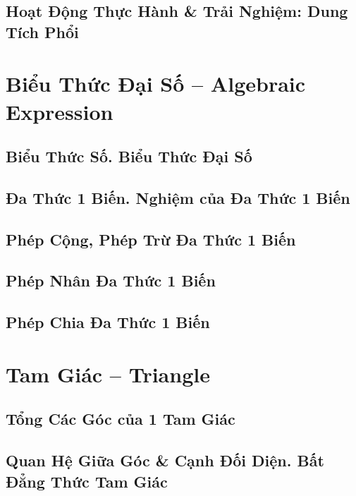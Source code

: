 \documentclass[oneside]{book}
\numberwithin{equation}{section}
\begin{document}
\section{Hoạt Động Thực Hành \& Trải Nghiệm: Dung Tích Phổi}


\chapter{Biểu Thức Đại Số -- Algebraic Expression}

\section{Biểu Thức Số. Biểu Thức Đại Số}

\section{Đa Thức 1 Biến. Nghiệm của Đa Thức 1 Biến}

\section{Phép Cộng, Phép Trừ Đa Thức 1 Biến}

\section{Phép Nhân Đa Thức 1 Biến}

\section{Phép Chia Đa Thức 1 Biến}


\chapter{Tam Giác -- Triangle}

\section{Tổng Các Góc của 1 Tam Giác}

\section{Quan Hệ Giữa Góc \& Cạnh Đối Diện. Bất Đẳng Thức Tam Giác}
\end{document}
